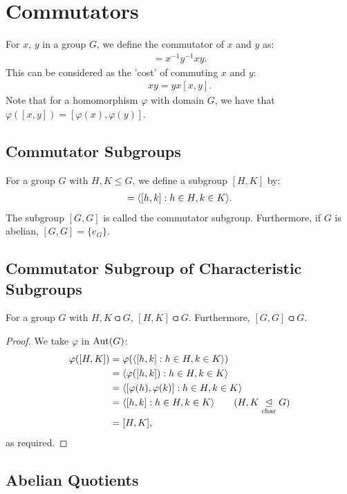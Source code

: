 \section{Commutators}

For $x$, $y$ in a group $G$, we define the commutator
of $x$ and $y$ as: \begin{align*}
    [x, y] = x^{-1}y^{-1}xy.
\end{align*} This can be considered as the 'cost' of commuting
$x$ and $y$: \begin{align*}
    xy = yx[x, y].
\end{align*} Note that
for a homomorphism $\varphi$ with domain $G$, we have that
$\varphi([x, y]) = [\varphi(x), \varphi(y)]$.

\subsection{Commutator Subgroups}

For a group $G$ with $H, K \leq G$, we define a subgroup $[H, K]$ by:
\begin{align*}
    [H, K] = \ang{[h, k] : h \in H, k \in K}.
\end{align*} The subgroup $[G, G]$ is called the commutator subgroup.
Furthermore, if $G$ is abelian, $[G, G] = \{e_G\}$.

\subsection{Commutator Subgroup of Characteristic Subgroups}

For a group $G$ with $H, K \csub G$, $[H, K] \csub G$. Furthermore,
$[G, G] \csub G$.

\begin{proof}
    We take $\varphi$ in $\operatorname{Aut}(G)$: \begin{align*}
        \varphi([H, K]) 
        &= \varphi(\ang{[h, k] : h \in H, k \in K}) \\
        &= \ang{\varphi([h, k]) : h \in H, k \in K} \\
        &= \ang{[\varphi(h), \varphi(k)] : h \in H, k \in K} \\
        &= \ang{[h, k] : h \in H, k \in K} \tag{$H, K \csub G$} \\
        &= [H, K],
    \end{align*} as required.
\end{proof}

\subsection{Abelian Quotients}

